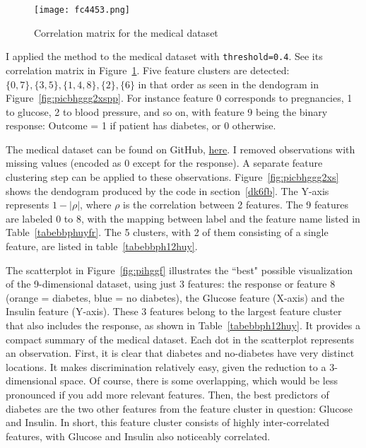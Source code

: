 \documentclass[oneside,10pt]{book}
\begin{document}
\begin{figure}[H]
\centering
\texttt{[image: fc4453.png]}
\caption{Correlation matrix for the medical dataset}
\label{fig:pihg}
\end{figure}

I applied the method to the medical dataset with \texttt{threshold=0.4}. See its  correlation matrix in Figure~\ref{fig:pihg}.
 Five feature clusters are
 detected: $\{0, 7\}, \{3, 5\}, \{1, 4, 8\}, \{2\}, \{6\}$
   in that order as seen in the dendogram in Figure~\ref{fig:picbhggg2xspp}.
For instance feature 0 corresponds to pregnancies, 1 to glucose, 2 to blood pressure, and so on,
 with feature 9 being the binary response: Outcome = 1 if patient has diabetes, or 0 otherwise.







The medical dataset can be found on GitHub, \href{https://github.com/VincentGranville/Main/blob/main/diabetes.csv}{here}. I removed observations with missing values (encoded as 0 except for the response). A separate feature clustering step can be applied to these observations. Figure~\ref{fig:picbhggg2xs} shows the dendogram produced by the code in section~\ref{dk6fb}. The Y-axis
 represents $1-|\rho|$, where $\rho$ is the correlation between 2 features. The 9 features are labeled
 0 to 8, with the mapping between label and the feature name listed in Table~\ref{tabebbphuyfr}. The 5 clusters, with 2 of them consisting of a single feature, are listed in table~\ref{tabebbph12huy}.



The scatterplot in Figure~\ref{fig:pihggf} illustrates the ``best" possible visualization of the 9-dimensional dataset, using just 3 features:
  the response or feature 8  (orange = diabetes, blue = no diabetes), the Glucose feature (X-axis) and the Insulin feature (Y-axis).
 These 3 features belong to the largest feature cluster that also includes the response, as shown in Table~\ref{tabebbph12huy}.
 It provides a compact summary of the medical dataset. Each dot in the scatterplot represents an observation.
 First, it is clear that diabetes and no-diabetes have very distinct locations. It makes discrimination relatively easy, given the reduction to a
 3-dimensional space. Of course, there is some overlapping, which would be less pronounced if you add more relevant features.
Then, the best predictors of diabetes are the two other features from the feature cluster in question: Glucose and Insulin.
In short, this feature cluster consists of highly inter-correlated features, with Glucose and Insulin also noticeably correlated.
\end{document}
